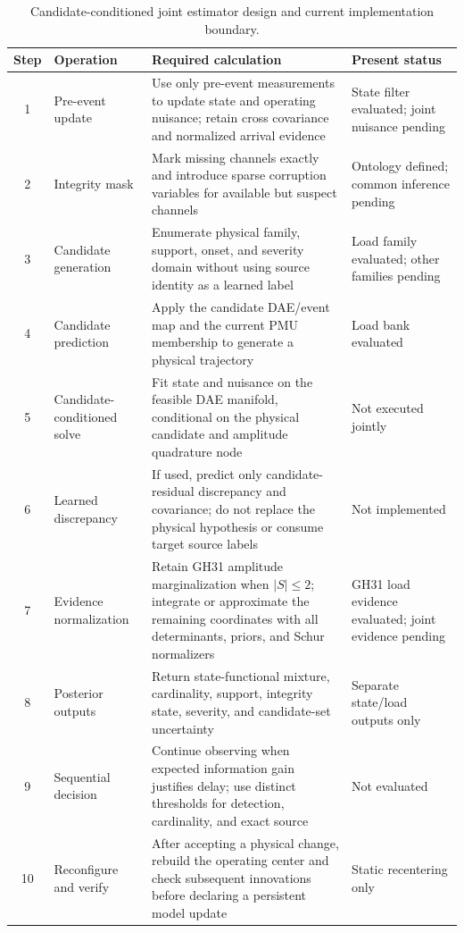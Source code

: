 \begin{table}[t]
\caption{Candidate-conditioned joint estimator design and current implementation boundary.}
\label{tab:supp-joint-algorithm}
\centering
\scriptsize
\setlength{\tabcolsep}{4pt}
\begin{tabularx}{\textwidth}{@{}c l X l@{}}
\toprule
Step & Operation & Required calculation & Present status \\
\midrule
1 & Pre-event update & Use only pre-event measurements to update state and operating nuisance; retain cross covariance and normalized arrival evidence & State filter evaluated; joint nuisance pending \\
2 & Integrity mask & Mark missing channels exactly and introduce sparse corruption variables for available but suspect channels & Ontology defined; common inference pending \\
3 & Candidate generation & Enumerate physical family, support, onset, and severity domain without using source identity as a learned label & Load family evaluated; other families pending \\
4 & Candidate prediction & Apply the candidate DAE/event map and the current PMU membership to generate a physical trajectory & Load bank evaluated \\
5 & Candidate-conditioned solve & Fit state and nuisance on the feasible DAE manifold, conditional on the physical candidate and amplitude quadrature node & Not executed jointly \\
6 & Learned discrepancy & If used, predict only candidate-residual discrepancy and covariance; do not replace the physical hypothesis or consume target source labels & Not implemented \\
7 & Evidence normalization & Retain GH31 amplitude marginalization when $|S|\le2$; integrate or approximate the remaining coordinates with all determinants, priors, and Schur normalizers & GH31 load evidence evaluated; joint evidence pending \\
8 & Posterior outputs & Return state-functional mixture, cardinality, support, integrity state, severity, and candidate-set uncertainty & Separate state/load outputs only \\
9 & Sequential decision & Continue observing when expected information gain justifies delay; use distinct thresholds for detection, cardinality, and exact source & Not evaluated \\
10 & Reconfigure and verify & After accepting a physical change, rebuild the operating center and check subsequent innovations before declaring a persistent model update & Static recentering only \\
\bottomrule
\end{tabularx}
\end{table}

